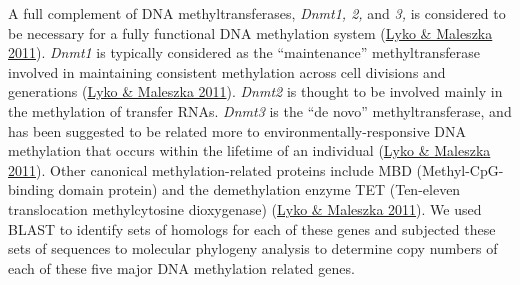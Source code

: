A full complement of DNA methyltransferases, \textit{Dnmt1, 2,} and
\textit{3,} is considered to be necessary for a fully functional DNA
methylation system (\protect\hyperlink{ux5fENREFux5f34}{Lyko \& Maleszka
2011}). \textit{Dnmt1} is typically considered as the ``maintenance''
methyltransferase involved in maintaining consistent methylation across
cell divisions and generations (\protect\hyperlink{ux5fENREFux5f34}{Lyko
\& Maleszka 2011}). \textit{Dnmt2} is thought to be involved mainly in the
methylation of transfer RNAs. \textit{Dnmt3} is the ``de novo''
methyltransferase, and has been suggested to be related more to
environmentally-responsive DNA methylation that occurs within the
lifetime of an individual (\protect\hyperlink{ux5fENREFux5f34}{Lyko \&
Maleszka 2011}). Other canonical methylation-related proteins include
MBD (Methyl-CpG-binding domain protein) and the demethylation enzyme TET
(Ten-eleven translocation methylcytosine dioxygenase)
(\protect\hyperlink{ux5fENREFux5f34}{Lyko \& Maleszka 2011}). We used
BLAST to identify sets of homologs for each of these genes and subjected
these sets of sequences to molecular phylogeny analysis to determine
copy numbers of each of these five major DNA methylation related genes.

